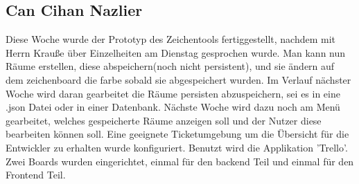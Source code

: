 \documentclass[]{article}
\begin{document}
\subsection{Can Cihan Nazlier}
Diese Woche wurde der Prototyp des Zeichentools fertiggestellt, nachdem mit Herrn Krauße über Einzelheiten am Dienstag gesprochen wurde. Man kann nun Räume erstellen, diese abspeichern(noch nicht persistent), und sie ändern auf dem zeichenboard die farbe sobald sie abgespeichert wurden. Im Verlauf nächster Woche wird daran gearbeitet die Räume persisten abzuspeichern, sei es in eine .json Datei oder in einer Datenbank. Nächste Woche wird dazu noch am Menü gearbeitet, welches gespeicherte Räume anzeigen soll und der Nutzer diese bearbeiten können soll. 
Eine geeignete Ticketumgebung um die Übersicht für die Entwickler zu erhalten wurde konfiguriert. Benutzt wird die Applikation 'Trello'. Zwei Boards wurden eingerichtet, einmal für den backend Teil und einmal für den Frontend Teil.

\printbibliography
\end{document}
